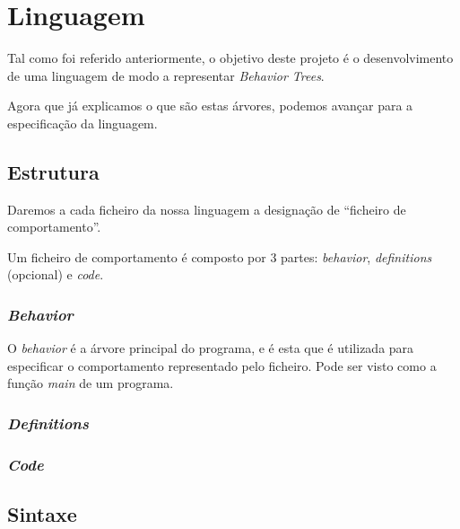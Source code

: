 
\chapter{Linguagem} %

\label{Chapter3} %

Tal como foi referido anteriormente, o objetivo deste projeto é o desenvolvimento de uma linguagem de modo a representar \textit{Behavior Trees}.

Agora que já explicamos o que são estas árvores, podemos avançar para a especificação da linguagem.

\section{Estrutura}
Daremos a cada ficheiro da nossa linguagem a designação de ``ficheiro de comportamento''.

Um ficheiro de comportamento é composto por 3 partes: \textit{behavior}, \textit{definitions} (opcional) e \textit{code}.

\subsection{\textit{Behavior}}
O \textit{behavior} é a árvore principal do programa, e é esta que é utilizada para especificar o comportamento representado pelo ficheiro.
Pode ser visto como a função \textit{main} de um programa.



\subsection{\textit{Definitions}}


\subsection{\textit{Code}}


\section{Sintaxe}


